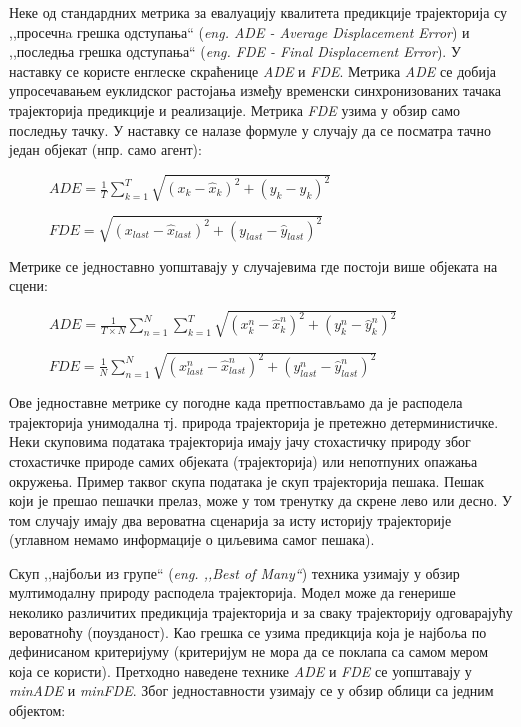 \documentclass[11pt,oneside]{memoir}
\begin{document}
Неке од стандардних метрика за евалуацију квалитета предикције трајекторија су ,,просечнa грешка одступања`` (\textit{eng. ADE - Average Displacement Error})
и ,,последња грешка одступања`` (\textit{eng. FDE - Final Displacement Error}). У наставку се користе енглеске скраћенице \textit{ADE} и
\textit{FDE}. Метрика \textit{ADE} се добија
упросечавањем еуклидског растојања између временски синхронизованих тачака трајекторија предикције и реализације. 
Метрика \textit{FDE} узима у обзир само последњу тачку. \cite{social_gan} \cite{argoverse} 
У наставку се налазе формуле у случају да се посматра тачно један објекат (нпр. само агент):

\begin{figure}[h!]
  \centering
  $ADE = \frac{1}{T}\sum_{k=1}^{T}\sqrt{(x_k - \hat{x}_k)^2 + (y_k - \hat{y}_k)^2}$
\end{figure}

\begin{figure}[h!]
  \centering
  $FDE = \sqrt{(x_{last} - \hat{x}_{last})^2 + (y_{last} - \hat{y}_{last})^2}$
\end{figure}

Метрике се једноставно уопштавају у случајевима где постоји више објеката на сцени:

\begin{figure}[h!]
  \centering
  $ADE = \frac{1}{T\times N}\sum_{n=1}^{N}\sum_{k=1}^{T}\sqrt{(x^n_k - \hat{x}^n_k)^2 + (y^n_k - \hat{y}^n_k)^2}$
\end{figure}

\begin{figure}[h!]
  \centering
  $FDE = \frac{1}{N}\sum_{n=1}^{N}\sqrt{(x^n_{last} - \hat{x}^n_{last})^2 + (y^n_{last} - \hat{y}^n_{last})^2}$
\end{figure}

Ове једноставне метрике су погодне када претпостављамо да је расподела трајекторија унимодална тј. природа трајекторија је претежно детерминистичке. 
Неки скуповима података трајекторија имају јачу стохастичку природу због стохастичке природе самих објеката (трајекторија) или непотпуних опажања окружења. 
Пример таквог скупа података је скуп трајекторија пешака. Пешак који је прешао пешачки прелаз, може у том тренутку да скрене лево или десно.
У том случају имају два вероватна сценарија за исту историју трајекторије (углавном немамо информације о циљевима самог пешака). \cite{social_gan} \cite{best_of_many_cvae}

Скуп ,,најбољи из групе`` (\textit{eng. ,,Best of Many``}) техника узимају у обзир мултимодалну природу расподела трајекторија. Модел може
да генерише неколико различитих предикција трајекторија и за сваку трајекторију одговарајућу вероватноћу (поузданост). Као грешка се узима предикција
која је најбоља по дефинисаном критеријуму (критеријум не мора да се поклапа са самом мером која се користи). \cite{best_of_many_cvae} \cite{argoverse}
Претходно наведене технике \textit{ADE} и \textit{FDE} се уопштавају у \textit{minADE} и \textit{minFDE}. Због једноставности узимају се у обзир облици
са једним објектом: \cite{Disdis} \cite{best_of_many_cvae}
\end{document}
